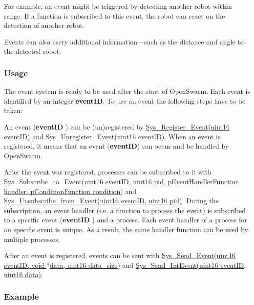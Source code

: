 For example, an event might be triggered by detecting another robot within range. If a function is subscribed to this event, the robot can react on the detection of another robot.

Events can also carry additional information---such as the distance and angle to the detected robot.\hypertarget{group__events_events_usage}{}\subsubsection{Usage}\label{group__events_events_usage}
The event system is ready to be used after the start of Open\+Swarm. Each event is identified by an integer {\bfseries event\+I\+D}. To use an event the following steps have to be taken\+:
\begin{DoxyEnumerate}
\item An event ({\bfseries event\+I\+D} ) can be (un)registered by \hyperlink{events_8h_a5d9657772509ddb7ac6f6e1aa5730308}{Sys\+\_\+\+Register\+\_\+\+Event(uint16 event\+I\+D)} and \hyperlink{events_8h_a41c81e9472691694352ac8316dc0ddbf}{Sys\+\_\+\+Unregister\+\_\+\+Event(uint16 event\+I\+D)}. When an event is registered, it means that an event ({\bfseries event\+I\+D}) can occur and be handled by Open\+Swarm.
\item After the event was registered, processes can be subscribed to it with \hyperlink{events_8h_a04afa9d5b243723e844d49ab9a7fd21e}{Sys\+\_\+\+Subscribe\+\_\+to\+\_\+\+Event(uint16 event\+I\+D, uint16 pid, p\+Event\+Handler\+Function handler, p\+Condition\+Function condition)} and \hyperlink{events_8h_a267d472a623ac449be3922865e736029}{Sys\+\_\+\+Unsubscribe\+\_\+from\+\_\+\+Event(uint16 event\+I\+D, uint16 pid)}. During the subscription, an event handler (i.\+e. a function to process the event) is subscribed to a specific event ({\bfseries event\+I\+D} ) and a process. Each event handler of a process for an specific event is unique. As a result, the same handler function can be used by multiple processes.
\item After an event is registered, events can be sent with \hyperlink{events_8h_a67230a5307e77a8112e56436f372926f}{Sys\+\_\+\+Send\+\_\+\+Event(uint16 event\+I\+D, void $\ast$data, uint16 data\+\_\+size)} and \hyperlink{events_8h_a3b90448a001da0eee45d39ac8bb76ac0}{Sys\+\_\+\+Send\+\_\+\+Int\+Event(uint16 event\+I\+D, uint16 data)}.
\end{DoxyEnumerate}\hypertarget{group__events_events_example}{}\subsubsection{Example}\label{group__events_events_example}

